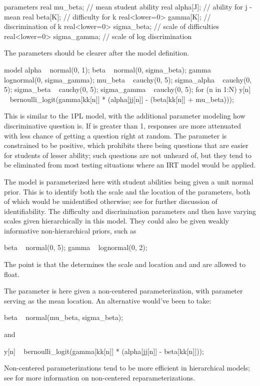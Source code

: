 \begin{stancode}
parameters {    
  real mu_beta;                  // mean student ability
  real alpha[J];               // ability for j - mean
  real beta[K];                // difficulty for k
  real<lower=0> gamma[K];      // discrimination of k
  real<lower=0> sigma_beta;    // scale of difficulties 
  real<lower=0> sigma_gamma;   // scale of log discrimination
}
\end{stancode}
%
The parameters should be clearer after the model definition.
%
\begin{stancode}
model {
  alpha ~ normal(0, 1);
  beta ~ normal(0, sigma_beta);   
  gamma ~ lognormal(0, sigma_gamma);
  mu_beta ~ cauchy(0, 5);
  sigma_alpha ~ cauchy(0, 5);
  sigma_beta ~ cauchy(0, 5);
  sigma_gamma ~ cauchy(0, 5);
  for (n in 1:N)
    y[n] ~ bernoulli_logit(gamma[kk[n]] 
                           * (alpha[jj[n]] - (beta[kk[n]] + mu_beta)));
}
\end{stancode}
%
This is similar to the 1PL model, with the additional parameter
 modeling how discriminative question  is.  If
 is greater than 1, responses are more attenuated with
less chance of getting a question right at random.  The parameter
 is constrained to be positive, which prohibits there
being questions that are easier for students of lesser ability;  such
questions are not unheard of, but they tend to be eliminated from most
testing situations where an IRT model would be applied.

The model is parameterized here with student abilities 
being given a unit normal prior.  This is to identify both the scale
and the location of the parameters, both of which would be
unidentified otherwise; see  for
further discussion of identifiability. The difficulty and
discrimination parameters  and  then have
varying scales given hierarchically in this model.  They could also be
given weakly informative non-hierarchical priors, such as
%
\begin{stancode}
  beta ~ normal(0, 5);
  gamma ~ lognormal(0, 2);
\end{stancode}
%
The point is that the  determines the scale and location
and  and  are allowed to float.  

The  parameter is here given a non-centered
parameterization, with parameter  serving as the mean
 location. An alternative would've been to take:
%
\begin{stancode}
  beta ~ normal(mu_beta, sigma_beta);
\end{stancode}
%
and
%
\begin{stancode}
  y[n] ~ bernoulli_logit(gamma[kk[n]] * (alpha[jj[n]] - beta[kk[n]]));
\end{stancode}
%
Non-centered parameterizations tend to be more efficient in
hierarchical models; see  for more
information on non-centered reparameterizations.  

